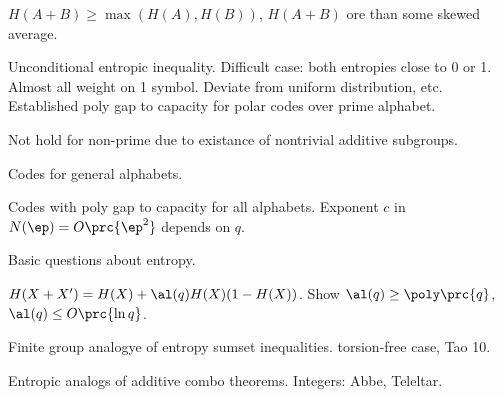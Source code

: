 $H(A+B)\ge \max (H(A),H(B))$,
$H(A+B)$ ore than some skewed average. 

Unconditional entropic inequality. 
Difficult case: both entropies close to 0 or 1. Almost all weight on 1 symbol. Deviate from uniform distribution, etc. Established poly gap to capacity for polar codes over prime alphabet. 

Not hold for non-prime due to existance of nontrivial additive subgroups.

Codes for general alphabets. 

Codes with poly gap to capacity for all alphabets. 
Exponent $c$ in $N(\ep)=O\prc{\ep^2}$ depends on $q$.

Basic questions about entropy. 

$H(X+X')=H(X)+\al(q) H(X)(1-H(X))$. Show $\al(q)\ge \poly\prc{q}$, $\al(q)\le O\prc{\ln q}$. 

Finite group analogye of entropy sumset inequalities. torsion-free case, Tao 10.

Entropic analogs of additive combo theorems. Integers: Abbe, Teleltar.


